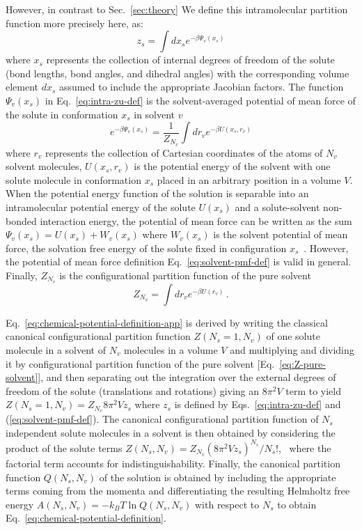 \documentclass[9pt,bestpractices]{livecoms}
\begin{document}
However, in contrast to Sec.~\ref{sec:theory} We define this intramolecular partition function more precisely here, as:
\begin{equation}
  z_s = \int dx_s e^{-\beta \Psi_v(x_s)}
  \label{eq:intra-zu-def}
\end{equation}
where $x_s$ represents the collection of internal degrees of freedom of the solute (bond lengths, bond angles, and dihedral angles) with the corresponding volume element $dx_s$ assumed to include the appropriate Jacobian factors. The function $\Psi_v(x_s)$ in Eq.~\ref{eq:intra-zu-def} is the solvent-averaged potential of mean force of the solute in conformation $x_s$ in solvent $v$~\cite{rouxandsimonson1999solventmodels} 
\begin{equation}
  e^{-\beta \Psi_v(x_s)} = \frac{1}{Z_{N_v}} \int dr_v e^{-\beta U(x_s, r_v)}
  \label{eq:solvent-pmf-def}
\end{equation}
where $r_v$ represents the collection of Cartesian coordinates of the atoms of $N_v$ solvent molecules, $U(x_s, r_v)$ is the potential energy of the solvent with one solute molecule in conformation $x_s$ placed in an arbitrary position in a volume $V$. When the potential energy function of the solution is separable into an intramolecular potential energy of the solute $U(x_s)$ and a solute-solvent non-bonded interaction energy, the potential of mean force can be written as the sum $\Psi_v(x_s) = U(x_s) + W_v(x_s)$ where $W_v(x_s)$ is the solvent potential of mean force, the solvation free energy of the solute fixed in configuration $x_s$~\cite{gilson2007calculation}. However, the potential of mean force definition Eq.~\ref{eq:solvent-pmf-def} is valid in general. Finally, $Z_{N_v}$ is the configurational partition function of the pure solvent
\begin{equation}
  Z_{N_v} = \int dr_v e^{-\beta U(r_v)} \, .
  \label{eq:Z-pure-solvent}
\end{equation}

Eq.~\ref{eq:chemical-potential-definition-app} is derived by writing the classical canonical configurational partition function $Z(N_s = 1, N_v)$ of one solute molecule in a solvent of $N_v$ molecules in a volume $V$ and multiplying and dividing it by configurational partition function of the pure solvent [Eq.~\ref{eq:Z-pure-solvent}], and then separating out the integration over the external degrees of freedom of the solute (translations and rotations) giving an $8 \pi^2 V$ term to yield $Z(N_s = 1, N_v) = Z_{N_v} 8 \pi^2 V z_s$ where $z_s$ is defined by Eqs.~\ref{eq:intra-zu-def} and (\ref{eq:solvent-pmf-def}). The canonical configurational partition function of $N_s$ independent solute molecules in a solvent is then obtained by considering the product of the solute terms $Z(N_s, N_v) = Z_{N_v} (8 \pi^2 V z_s)^{N_s}/N_s!$,~\cite{guggenheim1952mixtures504,simonson2016physical} where the factorial term accounts for indistinguishability. Finally, the canonical partition function $Q(N_s, N_v)$ of the solution is obtained by including the appropriate terms coming from the momenta and differentiating the resulting Helmholtz free energy $A(N_s, N_v) = -k_B T \ln Q(N_s, N_v)$ with respect to $N_s$ to obtain Eq.~\ref{eq:chemical-potential-definition}.
\end{document}

